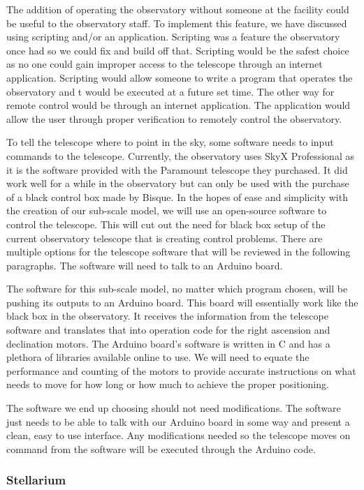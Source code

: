 \documentclass[12pt]{report}
\begin{document}
The addition of operating the observatory without someone at the facility could be useful to the observatory staff. To implement this feature, we have discussed using scripting and/or an application. Scripting was a feature the observatory once had so we could fix and build off that. Scripting would be the safest choice as no one could gain improper access to the telescope through an internet application. Scripting would allow someone to write a program that operates the observatory and t would be executed at a future set time. The other way for remote control would be through an internet application. The application would allow the user through proper verification to remotely control the observatory.

To tell the telescope where to point in the sky, some software needs to input commands to the telescope. Currently, the observatory uses SkyX Professional as it is the software provided with the Paramount telescope they purchased. It did work well for a while in the observatory but can only be used with the purchase of a black control box made by Bisque. In the hopes of ease and simplicity with the creation of our sub-scale model, we will use an open-source software to control the telescope. This will cut out the need for black box setup of the current observatory telescope that is creating control problems. There are multiple options for the telescope software that will be reviewed in the following paragraphs. The software will need to talk to an Arduino board.

The software for this sub-scale model, no matter which program chosen, will be pushing its outputs to an Arduino board. This board will essentially work like the black box in the observatory. It receives the information from the telescope software and translates that into operation code for the right ascension and declination motors. The Arduino board's software is written in C and has a plethora of libraries available online to use. We will need to equate the performance and counting of the motors to provide accurate instructions on what needs to move for how long or how much to achieve the proper positioning.

The software we end up choosing should not need modifications. The software just needs to be able to talk with our Arduino board in some way and present a clean, easy to use interface. Any modifications needed so the telescope moves on command from the software will be executed through the Arduino code.

\subsubsection*{Stellarium}
\end{document}
